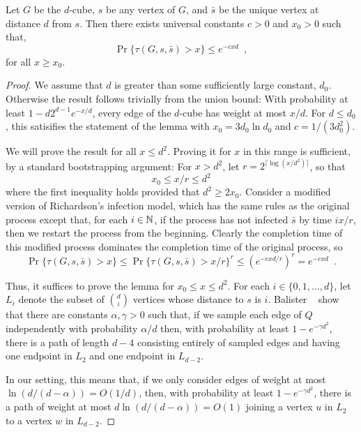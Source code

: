 \documentclass{patmorin}
\begin{document}

\begin{lem}
   Let $G$ be the $d$-cube, $s$ be any vertex of $G$, and
   $\bar{s}$ be the unique vertex at distance $d$ from $s$.  
   Then there exists universal constants
   $c>0$ and $x_0>0$ such that,
   \[ 
     \Pr\{\tau(G,s,\bar{s}) > x\} \le e^{-cxd} \enspace ,
   \]
   for all $x\ge x_0$.
\end{lem}

\begin{proof}
   We assume that $d$ is greater than some sufficiently large constant,
   $d_0$.  Otherwise the result follows trivially from the union bound:
   With probability at least $1-d2^{d-1} e^{-x/d}$, every edge of the
   $d$-cube has weight at most $x/d$.  For $d \le d_0$, this satisifies
   the statement of the lemma with $x_0=3d_0\ln d_0$ and $c=1/(3d_0^2)$.

   We will prove the result for all $x\le d^2$.  Proving it for $x$
   in this range is sufficient, by a standard bootstrapping argument:
   For $x > d^2$, let $r=2^{\lceil\log(x/d^2)\rceil}$, so that 
   \[ x_0 \le x/r \le d^2 \]
   where the first inequality holds provided that $d^2\ge 2x_0$.
   Consider a modified version of Richardson's infection model,
   which has the same rules as the original process
   except that, for each $i\in\mathbb{N}$, if the process has
   not infected $\bar{s}$ by time $ix/r$, then we restart the process
   from the beginning.  Clearly the completion time of this modified
   process dominates the completion time of the original process, so
   \[  \Pr\{\tau(G,s,\bar{s}) > x\} \le \Pr\{\tau(G,s,\bar{s}) > x/r\}^{r} 
      \le \left(e^{-cxd/r}\right)^{r} = e^{-cxd} \enspace .
   \]

   Thus, it suffices to prove the lemma for $x_0\le x\le d^2$.
   For each $i\in\{0,1,\ldots,d\}$, let $L_i$ denote the subset
   of $\binom{d}{i}$ vertices whose distance to $s$ is $i$.  Balister \etal\
   \cite[Lemma~4]{balister.bollobas.ea:first-passage} show that there are
   constants $\alpha,\gamma>0$ such that, if we sample each edge of $Q$
   independently with probability $\alpha/d$ then, with probability at
   least $1-e^{-\gamma d^2}$, there is a path of length $d-4$ consisting
   entirely of sampled edges and having one endpoint in $L_2$ and one
   endpoint in $L_{d-2}$.

   In our setting, this means that, if we only consider edges of
   weight at most $\ln(d/(d-\alpha)) = O(1/d)$, then, with probability
   at least $1-e^{-\gamma d^2}$, there is a path of weight at most
   $d\ln(d/(d-\alpha))=O(1)$ joining a vertex $u$ in $L_2$ to a vertex
   $w$ in $L_{d-2}$.


\end{proof}
\end{document}
